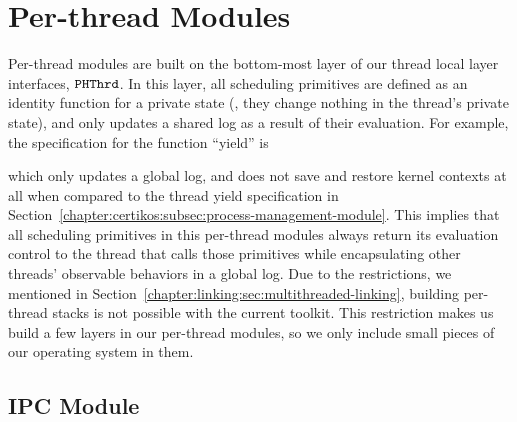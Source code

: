 \section{Per-thread Modules}
\label{chapter:certikos:sec:per-thread-modules}


Per-thread modules are built on
the bottom-most layer of our thread local layer interfaces, ${{\mathrm{\texttt{PHThrd}}}}$.
In this layer, all scheduling primitives are defined as an identity function for a private state (\ie, they change nothing in the thread's private state),
and only updates a shared log as a result of their evaluation. 
For example, the specification for the  function ``yield''  is

which only updates a global log, and does not save and restore kernel contexts at all when compared to the thread yield  specification
in Section~\ref{chapter:certikos:subsec:process-management-module}.
This implies that all scheduling primitives in this per-thread modules always return its evaluation control to the thread  that calls those primitives while
encapsulating other threads' observable behaviors in a global log.
Due to the restrictions, we mentioned in Section~\ref{chapter:linking:sec:multithreaded-linking},
building per-thread stacks is not possible with the current toolkit. 
This restriction makes us build a few layers in our per-thread modules,
so we only include small pieces of our operating system in them.



\subsection{IPC Module}
\label{chapter:certikos:subsec:ipc-module}

